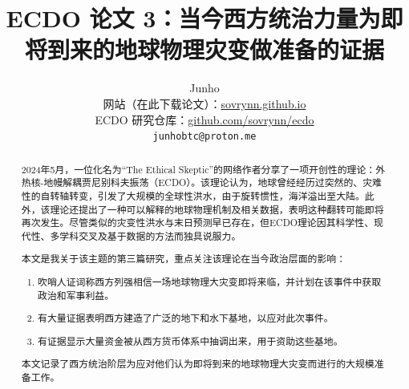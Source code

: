 \documentclass[10pt,twocolumn,letterpaper]{article}
\begin{document}
\title{ECDO 论文 3：当今西方统治力量为即将到来的地球物理灾变做准备的证据}

\author{Junho\\
网站（在此下载论文）：\href{https://sovrynn.github.io}{sovrynn.github.io}\\
ECDO 研究仓库：\href{https://github.com/sovrynn/ecdo}{github.com/sovrynn/ecdo}\\
{\tt\small junhobtc@proton.me}
}

\maketitle

\begin{abstract}
2024年5月，一位化名为“The Ethical Skeptic”的网络作者\cite{0}分享了一项开创性的理论：外热核-地幔解耦贾尼别科夫振荡（ECDO）\cite{1}。该理论认为，地球曾经经历过突然的、灾难性的自转轴转变，引发了大规模的全球性洪水，由于旋转惯性，海洋溢出至大陆。此外，该理论还提出了一种可以解释的地球物理机制及相关数据，表明这种翻转可能即将再次发生。尽管类似的灾变性洪水与末日预测早已存在，但ECDO理论因其科学性、现代性、多学科交叉及基于数据的方法而独具说服力。

本文是我关于该主题的第三篇研究\cite{2,3}，重点关注该理论在当今政治层面的影响：

\begin{flushleft}
\begin{enumerate}
    \item 吹哨人证词称西方列强相信一场地球物理大灾变即将来临，并计划在该事件中获取政治和军事利益。
    \item 有大量证据表明西方建造了广泛的地下和水下基地，以应对此次事件。
    \item 有证据显示大量资金被从西方货币体系中抽调出来，用于资助这些基地。
\end{enumerate}
\end{flushleft}

本文记录了西方统治阶层为应对他们认为即将到来的地球物理大灾变而进行的大规模准备工作。
\end{abstract}
\end{document}
